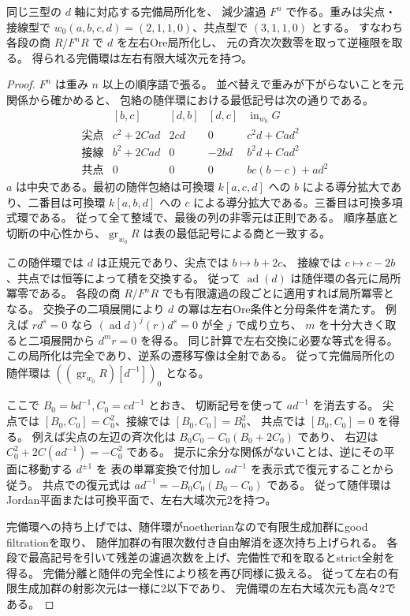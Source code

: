 \begin{proposition}\label{prop:cubic-CY-three-alpha-additive-axis}
同じ三型の $d$ 軸に対応する完備局所化を、
減少濾過 $F^n$ で作る。重みは尖点・接線型で
$w_0(a,b,c,d)=(2,1,1,0)$、共点型で $(3,1,1,0)$ とする。
すなわち各段の商 $R/F^nR$ で $d$ を左右Ore局所化し、
元の斉次次数零を取って逆極限を取る。
得られる完備環は左右有限大域次元を持つ。
\end{proposition}
\begin{proof}
$F^n$ は重み $n$ 以上の順序語で張る。
並べ替えで重みが下がらないことを元関係から確かめると、
包絡の随伴環における最低記号は次の通りである。
\[
\begin{array}{c|lll|l}
 & [b,c]&[d,b]&[d,c]&\operatorname{in}_{w_0}G\\\hline
\text{尖点}&c^2+2Cad&2cd&0&c^2d+Cad^2\\
\text{接線}&b^2+2Cad&0&-2bd&b^2d+Cad^2\\
\text{共点}&0&0&0&bc(b-c)+ad^2
\end{array}
\]
$a$ は中央である。最初の随伴包絡は可換環 $k[a,c,d]$ への
$b$ による導分拡大であり、二番目は可換環 $k[a,b,d]$ への
$c$ による導分拡大である。三番目は可換多項式環である。
従って全て整域で、最後の列の非零元は正則である。
順序基底と切断の中心性から、$\operatorname{gr}_{w_0}R$
は表の最低記号による商と一致する。

この随伴環では $d$ は正規元であり、尖点では $b\mapsto b+2c$、
接線では $c\mapsto c-2b$、共点では恒等によって積を交換する。
従って $\operatorname{ad}(d)$ は随伴環の各元に局所冪零である。
各段の商 $R/F^nR$ でも有限濾過の段ごとに適用すれば局所冪零となる。
交換子の二項展開により $d$ の冪は左右Ore条件と分母条件を満たす。
例えば $r d^s=0$ なら $(\operatorname{ad}d)^j(r)d^s=0$ が全 $j$ で成り立ち、
$m$ を十分大きく取ると二項展開から $d^m r=0$ を得る。
同じ計算で左右交換に必要な等式を得る。
この局所化は完全であり、逆系の遷移写像は全射である。
従って完備局所化の随伴環は
$((\operatorname{gr}_{w_0}R)[d^{-1}])_0$ となる。

ここで $B_0=bd^{-1},C_0=cd^{-1}$ とおき、
切断記号を使って $ad^{-1}$ を消去する。
尖点では $[B_0,C_0]=C_0^2$、接線では $[B_0,C_0]=B_0^2$、
共点では $[B_0,C_0]=0$ を得る。
例えば尖点の左辺の斉次化は
$B_0C_0-C_0(B_0+2C_0)$ であり、
右辺は $C_0^2+2C(ad^{-1})=-C_0^2$ である。
提示に余分な関係がないことは、逆にその平面に移動する $d^{\pm1}$ を
表の単冪変換で付加し $ad^{-1}$ を表示式で復元することから従う。
共点での復元式は $ad^{-1}=-B_0C_0(B_0-C_0)$ である。
従って随伴環はJordan平面または可換平面で、左右大域次元2を持つ。

完備環への持ち上げでは、随伴環がnoetherianなので有限生成加群にgood filtrationを取り、
随伴加群の有限次数付き自由解消を逐次持ち上げられる。
各段で最高記号を引いて残差の濾過次数を上げ、完備性で和を取るとstrict全射を得る。
完備分離と随伴の完全性により核を再び同様に扱える。
従って左右の有限生成加群の射影次元は一様に2以下であり、
完備環の左右大域次元も高々2である。
\end{proof}


